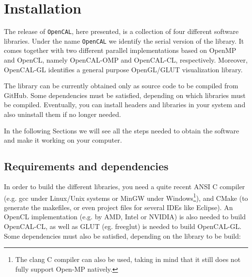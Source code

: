 \chapter{Installation} \label{ch:installation}

The release of \verb'OpenCAL', here presented, is a collection of four
different software libraries. Under the name \verb'OpenCAL' we
identify the serial version of the library. It comes together with two
different parallel implementations based on OpenMP and OpenCL, namely
OpenCAL-OMP and OpenCAL-CL, respectively. Moreover, OpenCAL-GL
identifies a general purpose OpenGL/GLUT visualization library.


The library can be currently obtained only as source code to be
compiled from GitHub. Some dependencies must be satisfied, depending
on which libraries must be compiled. Eventually, you
can install headers and libraries in your system and also uninstall
them if no longer needed.


In the following Sections we will see all the steps needed to obtain
the software and make it working on your computer.

\section{Requirements and dependencies}

In order to build the different libraries, you need a quite recent
ANSI C compiler (e.g. gcc under Linux/Unix systems or MinGW under
Windows\footnote{The clang C compiler can also be used, taking in mind
  that it still does not fully support Open-MP natively.}), and CMake
(to generate the makefiles, or even project files for several IDEs
like Eclipse). An OpenCL implementation (e.g. by AMD, Intel or NVIDIA)
is also needed to build OpenCAL-CL, as well as GLUT (eg. freeglut) is
needed to build OpenCAL-GL. Some dependencies must also be satisfied,
depending on the library to be build:


